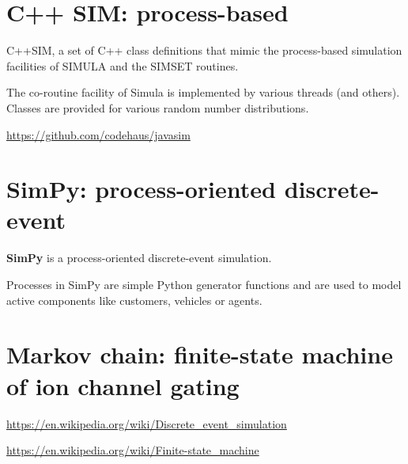 \section{C++ SIM: process-based}

C++SIM, a set of  C++ class definitions  that mimic the process-based 
simulation facilities of SIMULA and the SIMSET routines.

The  co-routine facility of Simula   is implemented by various threads
(and others).  Classes  are    provided  for various   random   number
distributions.

\url{https://github.com/codehaus/javasim}

\section{SimPy: process-oriented discrete-event}
\label{sec:SimPy}

{\bf SimPy} is 
a  process-oriented discrete-event simulation.

Processes in SimPy are simple Python generator functions and are used to model
active components like customers, vehicles or agents. 

\section{Markov chain: finite-state machine of ion channel gating}

\url{https://en.wikipedia.org/wiki/Discrete_event_simulation}

\url{https://en.wikipedia.org/wiki/Finite-state_machine}